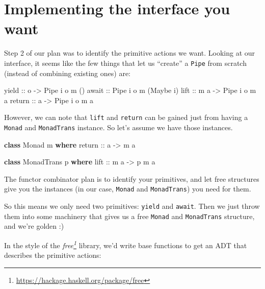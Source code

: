 \documentclass[]{article}
\newenvironment{Shaded}{}{}
\newcommand{\DataTypeTok}[1]{\textcolor[rgb]{0.56,0.13,0.00}{#1}}
\newcommand{\FunctionTok}[1]{\textcolor[rgb]{0.02,0.16,0.49}{#1}}
\newcommand{\KeywordTok}[1]{\textcolor[rgb]{0.00,0.44,0.13}{\textbf{#1}}}
\newcommand{\NormalTok}[1]{#1}
\newcommand{\OtherTok}[1]{\textcolor[rgb]{0.00,0.44,0.13}{#1}}
\renewcommand{\href}[2]{#2\footnote{\url{#1}}}
\begin{document}
\hypertarget{implementing-the-interface-you-want}{%
\section{Implementing the interface you
want}\label{implementing-the-interface-you-want}}

Step 2 of our plan was to identify the primitive actions we want. Looking at our
interface, it seems like the few things that let us ``create'' a \texttt{Pipe}
from scratch (instead of combining existing ones) are:

\begin{Shaded}
\begin{Highlighting}[]
\OtherTok{yield  ::}\NormalTok{ o }\OtherTok{{-}>} \DataTypeTok{Pipe}\NormalTok{ i o m ()}
\OtherTok{await  ::} \DataTypeTok{Pipe}\NormalTok{ i o m (}\DataTypeTok{Maybe}\NormalTok{ i)}
\OtherTok{lift   ::}\NormalTok{ m a }\OtherTok{{-}>} \DataTypeTok{Pipe}\NormalTok{ i o m a}
\FunctionTok{return}\OtherTok{ ::}\NormalTok{ a   }\OtherTok{{-}>} \DataTypeTok{Pipe}\NormalTok{ i o m a}
\end{Highlighting}
\end{Shaded}

However, we can note that \texttt{lift} and \texttt{return} can be gained just
from having a \texttt{Monad} and \texttt{MonadTrans} instance. So let's assume
we have those instances.

\begin{Shaded}
\begin{Highlighting}[]
\KeywordTok{class} \DataTypeTok{Monad}\NormalTok{ m }\KeywordTok{where}
\OtherTok{    return ::}\NormalTok{ a }\OtherTok{{-}>}\NormalTok{ m a}

\KeywordTok{class} \DataTypeTok{MonadTrans}\NormalTok{ p }\KeywordTok{where}
\OtherTok{    lift ::}\NormalTok{ m a }\OtherTok{{-}>}\NormalTok{ p m a}
\end{Highlighting}
\end{Shaded}

The functor combinator plan is to identify your primitives, and let free
structures give you the instances (in our case, \texttt{Monad} and
\texttt{MonadTrans}) you need for them.

So this means we only need two primitives: \texttt{yield} and \texttt{await}.
Then we just throw them into some machinery that gives us a free \texttt{Monad}
and \texttt{MonadTrans} structure, and we're golden :)

In the style of the \emph{\href{https://hackage.haskell.org/package/free}{free}}
library, we'd write base functions to get an ADT that describes the primitive
actions:
\end{document}
